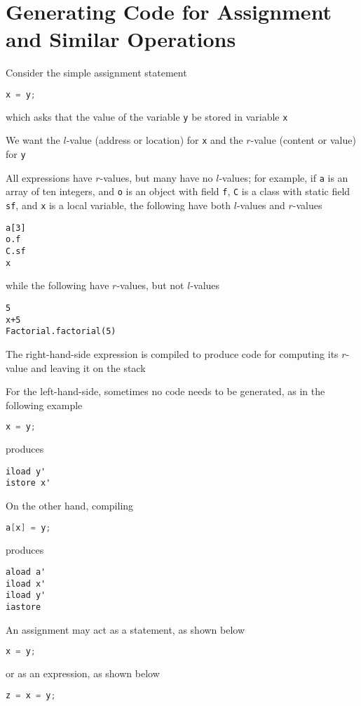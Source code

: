 \documentclass[8pt,a4paper,compress]{beamer}
\begin{document}
\section{Generating Code for Assignment and Similar Operations}
\begin{frame}[fragile]
\pause

Consider the simple assignment statement
\begin{lstlisting}[language=Java]
x = y;
\end{lstlisting}
which asks that the value of the variable \lstinline{y} be stored in variable \lstinline{x}

\pause
\bigskip

We want the $l$-value (address or location) for \lstinline{x} and the $r$-value (content or value) for \lstinline{y}

\pause
\bigskip

All expressions have $r$-values, but many have no $l$-values; for example, if \lstinline{a} is an array of ten integers, and \lstinline{o} is an object with field \lstinline{f}, \lstinline{C} is a class with static field \lstinline{sf}, and \lstinline{x} is a local variable, the following have both $l$-values and $r$-values 
\begin{lstlisting}[language={}]
a[3]
o.f
C.sf
x
\end{lstlisting}
while the following have $r$-values, but not $l$-values
\begin{lstlisting}[language={}]
5
x+5
Factorial.factorial(5)
\end{lstlisting}
\end{frame}

\begin{frame}[fragile]
\pause

The right-hand-side expression is compiled to produce code for computing its $r$-value and leaving it on the stack

\pause
\bigskip

For the left-hand-side, sometimes no code needs to be generated, as in the following example
\begin{lstlisting}[language=Java]
x = y;
\end{lstlisting}
produces
\begin{lstlisting}[language={}]
iload y'
istore x'
\end{lstlisting}

On the other hand, compiling
\begin{lstlisting}[language=Java]
a[x] = y;
\end{lstlisting}
produces
\begin{lstlisting}[language={}]
aload a'
iload x'
iload y'
iastore
\end{lstlisting}

\pause
\bigskip

An assignment may act as a statement, as shown below
\begin{lstlisting}[language=Java]
x = y;
\end{lstlisting}
or as an expression, as shown below
\begin{lstlisting}[language=Java]
z = x = y;
\end{lstlisting}
\end{frame}
\end{document}
